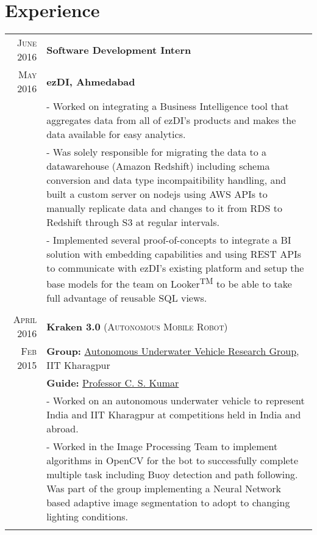 \documentclass[a4paper,10pt]{extarticle} %
\begin{document}
\section{Experience}

\begin{tabular}{r|p{16cm}}

\textsc{June 2016} & \textbf{Software Development Intern}\\
\textsc{May 2016} & \textbf{ezDI, Ahmedabad}\\
& \footnotesize{- Worked on integrating a Business Intelligence tool that aggregates data from all of ezDI's products and makes the data available for easy analytics.}\\
& \footnotesize{- Was solely responsible for migrating the data to a datawarehouse (Amazon Redshift) including schema conversion and data type incompaitibility handling, and built a custom server on nodejs using AWS APIs to manually replicate data and changes to it from RDS to Redshift through S3 at regular intervals.}\\
& \footnotesize{- Implemented several proof-of-concepts to integrate a BI solution with embedding capabilities and using REST APIs to communicate with ezDI's existing platform and setup the base models for the team on Looker{\textsuperscript{TM}} to be able to take full advantage of reusable SQL views.}\\
\multicolumn{2}{c}{} \\

\textsc{April 2016} & \textbf{Kraken 3.0} \textsc{(Autonomous Mobile Robot)} \\
\textsc{Feb 2015} & \textbf{Group: }\textmd{\href{http://auv-iitkgp.in/}{Autonomous Underwater Vehicle Research Group}}, IIT Kharagpur\\
& \textbf{Guide: }\textmd{\href{http://iitkgp.ac.in/fac-profiles/showprofile.php?empcode=aWmdU}{Professor C. S. Kumar}}\\
& \footnotesize{- Worked on an autonomous underwater vehicle to represent India and IIT Kharagpur at competitions held in India and abroad.}\\
& \footnotesize{- Worked in the Image Processing Team to implement algorithms in OpenCV for the bot to successfully complete multiple task including Buoy detection and path following. Was part of the group implementing a Neural Network based adaptive image segmentation to adopt to changing lighting conditions.}\\
\multicolumn{2}{c}{} \\

\end{tabular}
\end{document}

